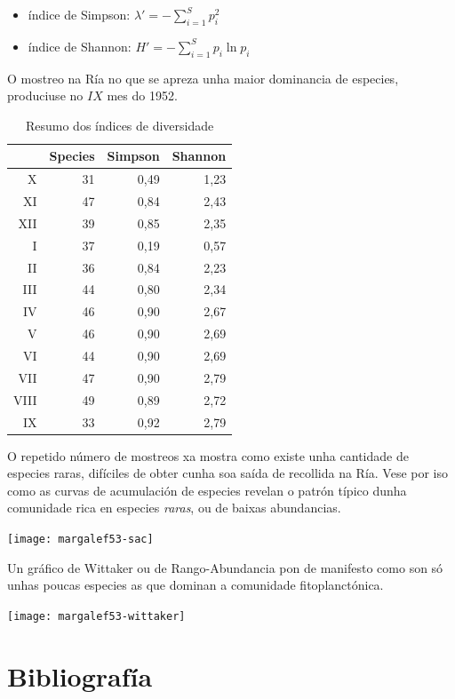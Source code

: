 \documentclass{article}
\begin{document}
\begin{itemize}
  \item índice de Simpson: $ \lambda' = -\sum_{i=1}^S p_i^2 $
  \item índice de Shannon: $ H' = -\sum_{i=1}^S p_i \ln p_i $
\end{itemize}

O mostreo na Ría no que se apreza unha maior dominancia de especies, produciuse no $IX$ mes do 1952.
 
\begin{table}[ht]
\centering
\begin{tabular}{rrrr}
  \hline
 & Species & Simpson & Shannon \\ 
  \hline
X &  31 & 0,49 & 1,23 \\ 
  XI &  47 & 0,84 & 2,43 \\ 
  XII &  39 & 0,85 & 2,35 \\ 
  I &  37 & 0,19 & 0,57 \\ 
  II &  36 & 0,84 & 2,23 \\ 
  III &  44 & 0,80 & 2,34 \\ 
  IV &  46 & 0,90 & 2,67 \\ 
  V &  46 & 0,90 & 2,69 \\ 
  VI &  44 & 0,90 & 2,69 \\ 
  VII &  47 & 0,90 & 2,79 \\ 
  VIII &  49 & 0,89 & 2,72 \\ 
  IX &  33 & 0,92 & 2,79 \\ 
   \hline
\end{tabular}
\caption{Resumo dos índices de diversidade} 
\end{table}

O repetido número de mostreos xa mostra como existe unha cantidade de especies raras, difíciles de obter cunha soa saída de recollida na Ría. Vese por iso como as curvas de acumulación de especies revelan o patrón típico dunha comunidade rica en especies \textit{raras}, ou de baixas abundancias.

\texttt{[image: margalef53-sac]}

Un gráfico de Wittaker ou de Rango-Abundancia pon de manifesto como son só unhas poucas especies as que dominan a comunidade fitoplanctónica. 

\texttt{[image: margalef53-wittaker]}

\section{Bibliografía}
\end{document}
